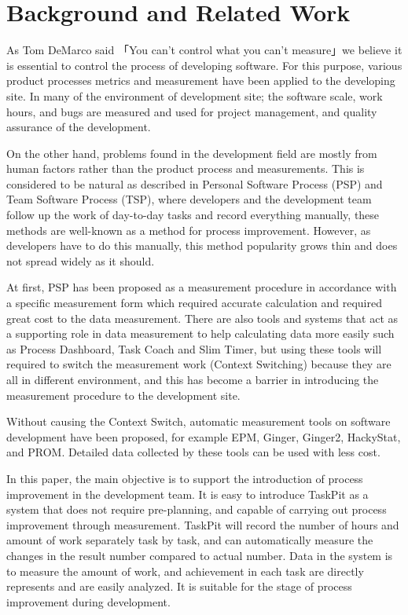 \documentclass {article}
\begin{document}
\section {Background and Related Work}
	
	As Tom DeMarco said 「You can't control what you can't measure」we believe it is essential to control the process of developing software\cite{demarco1986controlling}. For this purpose, various product processes metrics and measurement have been applied to the developing site\cite{grady1992practical}. In many of the environment of development site; the software scale, work hours, and bugs are measured and used for project management, and quality assurance of the development\cite{nec2010software}\cite{putnam2013five}. \par
	On the other hand, problems found in the development field are mostly from human factors\cite{sec2010itproject} rather than the product process and measurements. This is considered to be natural as described in Personal Software Process (PSP) and Team Software Process (TSP), where developers and the development team follow up the work of day-to-day tasks and record everything manually, these methods are well-known as a method for process improvement\cite{humphrey1995discipline}\cite{humphrey2001}. However, as developers have to do this manually, this method popularity grows thin and does not spread widely as it should. \par
	At first, PSP has been proposed as a measurement procedure in accordance with a specific measurement form which required accurate calculation and required great cost to the data measurement. There are also tools and systems that act as a supporting role in data measurement to help calculating data more easily such as Process Dashboard\cite{processdashboard}, Task Coach\cite{taskcoach} and Slim Timer\cite{slimtimer}, but using these tools will required to switch the measurement work (Context Switching) because they are all in different environment, and this has become a barrier in introducing the measurement procedure to the development site\cite{sillitti2003collecting}. \par
	Without causing the Context Switch, automatic measurement tools on software development have been proposed, for example EPM\cite{ohira2004empirical}, Ginger\cite{}, Ginger2\cite{torii1999ginger2}, HackyStat\cite{}, and PROM\cite{}. Detailed data collected by these tools can be used with less cost. \par
	In this paper, the main objective is to support the introduction of process improvement in the development team. It is easy to introduce TaskPit as a system that does not require pre-planning, and capable of carrying out process improvement through measurement. TaskPit will record the number of hours and amount of work separately task by task, and can automatically measure the changes in the result number compared to actual number. Data in the system is to measure the amount of work, and achievement in each task are directly represents and are easily analyzed. It is suitable for the stage of process improvement during development.
	
\end{document}
